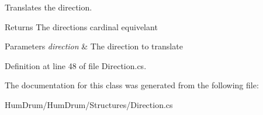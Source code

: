 Translates the direction. 

\begin{DoxyReturn}{Returns}
The direction\textquotesingle{}s cardinal equivelant
\end{DoxyReturn}

\begin{DoxyParams}{Parameters}
{\em direction} & The direction to translate\\
\hline
\end{DoxyParams}


Definition at line 48 of file Direction.\+cs.



The documentation for this class was generated from the following file\+:\begin{DoxyCompactItemize}
\item 
Hum\+Drum/\+Hum\+Drum/\+Structures/Direction.\+cs\end{DoxyCompactItemize}

